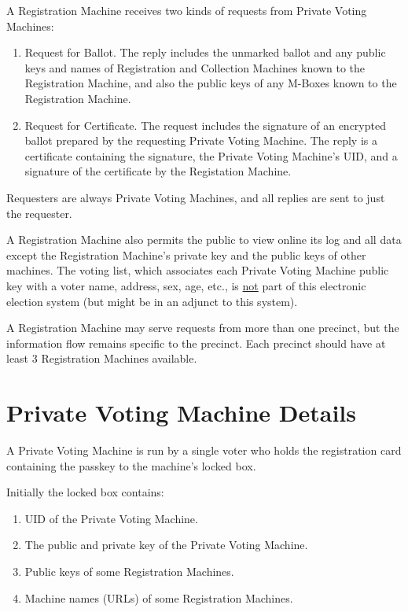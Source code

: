 \documentclass[12pt]{article}
\begin{document}
A Registration Machine receives two kinds of requests from
Private Voting Machines:
\begin{enumerate}

\item
Request for Ballot.  The reply includes the unmarked ballot
and any public keys and names of Registration and
Collection Machines known to the Registration Machine,
and also the public keys of any M-Boxes known to the Registration
Machine.

\item
Request for Certificate.  The request includes the signature
of an encrypted ballot prepared by the requesting Private
Voting Machine.  The reply is a certificate containing
the signature, the Private Voting Machine's UID,
and a signature of the certificate by the Registation Machine.

\end{enumerate}

Requesters are always Private Voting Machines, and all replies
are sent to just the requester.

A Registration Machine also permits the public to view online
its log and all data except the Registration Machine's
private key and the public keys of other machines.
The voting list, which associates each Private
Voting Machine public key with a voter name, address, sex,
age, etc., is \underline{not} part of this electronic
election system (but might be in an adjunct to this system).

A Registration Machine may serve requests from more than
one precinct, but the information flow remains specific
to the precinct.  Each precinct should have at least 3
Registration Machines available.

\section{Private Voting Machine Details}

A Private Voting Machine is run by a single voter
who holds the registration card containing the passkey to
the machine's locked box.

Initially the locked box contains:
\begin{enumerate}
\item UID of the Private Voting Machine.
\item The public and private key of the Private Voting Machine.
\item Public keys of some Registration Machines.
\item Machine names (URLs) of some Registration Machines.
\setcounter{PVM-COUNTER}{\value{enumi}}
\end{enumerate}
\end{document}

